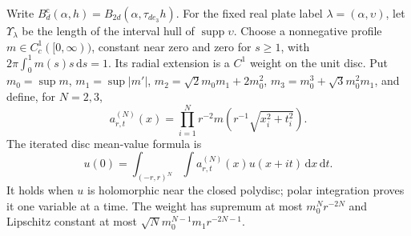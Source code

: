 \documentclass[11pt,letterpaper,reqno]{amsart}
\theoremstyle{definition}
\theoremstyle{remark}
\begin{document}
Write $B_d^{\mathrm c}(\alpha,h)=
B_{2d}(\alpha,\tau_{de_3}h)$.
For the fixed real plate label
$\lambda=(\alpha,\upsilon)$, let $\Upsilon_\lambda$
be the length of the interval hull of
$\operatorname{supp}\upsilon$.
Choose a nonnegative profile $m\in C_c^1([0,\infty))$,
constant near zero and zero for $s\ge1$, with
$2\pi\int_0^1m(s)s\,\mathrm{d}s=1$.
Its radial extension is a $C^1$ weight on the unit disc.
Put $m_0=\sup m$, $m_1=\sup|m'|$,
$m_2=\sqrt2m_0m_1+2m_0^2$,
$m_3=m_0^3+\sqrt3m_0^2m_1$, and define, for $N=2,3$,
\[
 a^{(N)}_{r,t}(x)=\prod_{i=1}^N
       r^{-2}m(r^{-1}\sqrt{x_i^2+t_i^2}).
\]
The iterated disc mean-value formula is
\begin{equation}\label{IV-34-16}
 u(0)=\int_{(-r,r)^N}\int a^{(N)}_{r,t}(x)u(x+it)
                                      \,\mathrm{d}x\,\mathrm{d}t.
\end{equation}
It holds when $u$ is holomorphic near the closed
polydisc; polar integration proves it one variable at
a time. The weight has supremum at most
$m_0^Nr^{-2N}$ and Lipschitz constant at most
$\sqrt N m_0^{N-1}m_1r^{-2N-1}$.
\end{document}
